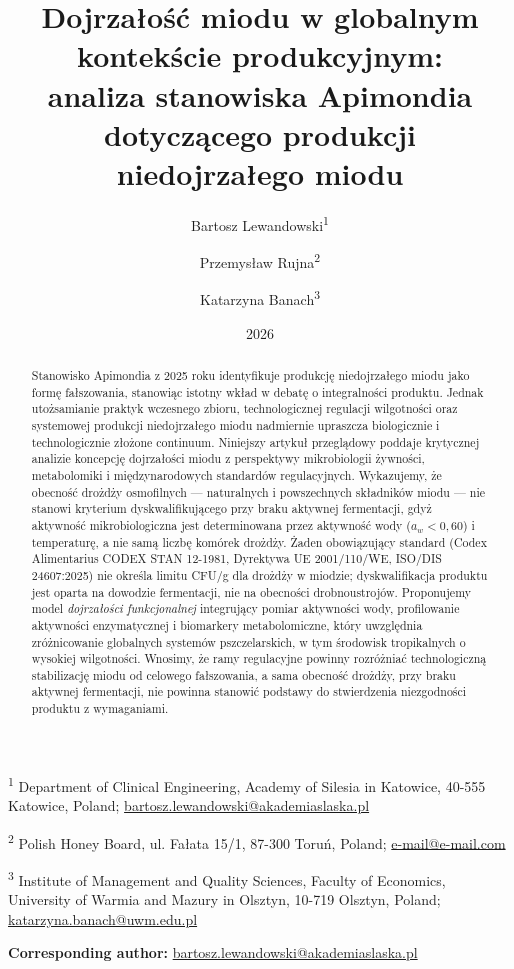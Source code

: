 \documentclass[12pt,a4paper]{article}
\title{Dojrzałość miodu w globalnym kontekście produkcyjnym:\\
analiza stanowiska Apimondia dotyczącego produkcji niedojrzałego miodu}
\author{
Bartosz Lewandowski\textsuperscript{1} \and
Przemysław Rujna\textsuperscript{2} \and
Katarzyna Banach\textsuperscript{3}
}
\date{2026}
\begin{document}
\maketitle

\begin{center}
\small
\textsuperscript{1} Department of Clinical Engineering, Academy of Silesia in Katowice, 40-555 Katowice, Poland; \href{mailto:bartosz.lewandowski@akademiaslaska.pl}{bartosz.lewandowski@akademiaslaska.pl}

\textsuperscript{2} Polish Honey Board, ul. Fałata 15/1, 87-300 Toruń, Poland; \href{mailto:e-mail@e-mail.com}{e-mail@e-mail.com}

\textsuperscript{3} Institute of Management and Quality Sciences, Faculty of Economics, University of Warmia and Mazury in Olsztyn, 10-719 Olsztyn, Poland; \href{mailto:katarzyna.banach@uwm.edu.pl}{katarzyna.banach@uwm.edu.pl}

\vspace{0.5em}
\textbf{Corresponding author:} \href{mailto:bartosz.lewandowski@akademiaslaska.pl}{bartosz.lewandowski@akademiaslaska.pl}
\end{center}

\begin{abstract}
Stanowisko Apimondia z 2025 roku identyfikuje produkcję niedojrzałego
miodu jako formę fałszowania, stanowiąc istotny wkład w debatę
o integralności produktu. Jednak utożsamianie praktyk wczesnego
zbioru, technologicznej regulacji wilgotności oraz systemowej produkcji
niedojrzałego miodu nadmiernie upraszcza biologicznie i technologicznie
złożone continuum. Niniejszy artykuł przeglądowy poddaje krytycznej
analizie koncepcję dojrzałości miodu z perspektywy mikrobiologii
żywności, metabolomiki i międzynarodowych standardów regulacyjnych.
Wykazujemy, że obecność drożdży osmofilnych --- naturalnych
i powszechnych składników miodu --- nie stanowi kryterium
dyskwalifikującego przy braku aktywnej fermentacji, gdyż aktywność
mikrobiologiczna jest determinowana przez aktywność wody (\(a_w < 0{,}60\))
i temperaturę, a nie samą liczbę komórek drożdży. Żaden obowiązujący
standard (Codex Alimentarius CODEX STAN 12-1981, Dyrektywa UE
2001/110/WE, ISO/DIS 24607:2025) nie określa limitu CFU/g dla drożdży
w miodzie; dyskwalifikacja produktu jest oparta na dowodzie fermentacji,
nie na obecności drobnoustrojów. Proponujemy model \emph{dojrzałości
funkcjonalnej} integrujący pomiar aktywności wody, profilowanie
aktywności enzymatycznej i biomarkery metabolomiczne, który
uwzględnia zróżnicowanie globalnych systemów pszczelarskich, w tym
środowisk tropikalnych o wysokiej wilgotności. Wnosimy, że ramy
regulacyjne powinny rozróżniać technologiczną stabilizację miodu
od celowego fałszowania, a sama obecność drożdży, przy braku aktywnej
fermentacji, nie powinna stanowić podstawy do stwierdzenia niezgodności
produktu z wymaganiami.
\end{abstract}
\end{document}
